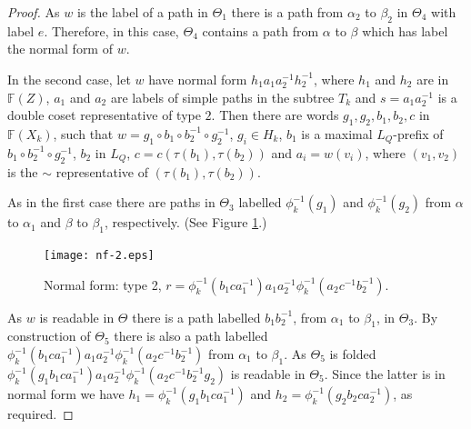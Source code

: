 \documentclass[a4paper,12pt]{article}
\renewcommand{\a}{\alpha }
\renewcommand{\b}{\beta }
\newcommand{\T}{\Theta }
\renewcommand{\t}{\tau }
\numberwithin{equation}{section}
\numberwithin{figure}{section}
\newcommand{\FF}{\ensuremath{\mathbb{F}}}
\begin{document}
\begin{proof}
As $w$ is the label of a path in $\T_1$ there is a path from $\a_2$ to
$\b_2$ in $\T_4$ with label $e$. Therefore, in this case, $\T_4$ contains
a path from $\a$ to $\b$ which has label the normal form of $w$.

In the second case,
let $w$ have normal form $h_1 a_1 a_2^{-1} h_2^{-1} $, where
$h_1$ and $h_2$ are in $\FF(Z)$,  $a_1$ and $a_2$ are labels
of simple paths in the subtree $T_k$ and $s=a_1a_2^{-1}$ is a double coset
representative of type $2$. Then there are words
$g_1, g_2, b_1, b_2, c$  in $\FF(X_k)$,  such that
$w=g_1\circ b_1 \circ b_2^{-1}\circ g_2^{-1}$,
$g_i\in H_k$, $b_1$ is a maximal $L_Q$-prefix of
$b_1 \circ b_2^{-1}\circ g_2^{-1}$, $b_2$ in
$L_Q$, $c=c(\t(b_1),\t(b_2))$ and $a_i=w(v_i)$, where
$(v_1,v_2)$ is the $\sim$ representative of $(\t(b_1),\t(b_2))$.



As in the first case there are paths in $\T_3$ labelled
$\phi_k^{-1}(g_1)$ and
$\phi_k^{-1}(g_2)$ from $\a$ to $\a_1$ and $\b$ to $\b_1$, respectively.
(See Figure \ref{fig:nf-2}.)
\begin{figure}
\begin{center}
\psfrag{a}{$\a$}
\psfrag{b}{$\b$}
\psfrag{a1}{$\a_1$}
\psfrag{a2}{$\a_2$}
\psfrag{b1}{$\b_1$}
\psfrag{b2}{$\b_2$}
\psfrag{Th5}{$\T_5$}
\texttt{[image: nf-2.eps]}
\end{center}
\caption{Normal form: type 2, $r=\phi_k^{-1}(b_1ca_1^{-1})a_1a_2^{-1}\phi_k^{-1}(a_2c^{-1}b_2^{-1})$.}
\label{fig:nf-2}
\end{figure}
As $w$ is readable in $\T$ there is a path labelled $b_1b_2^{-1}$, from
$\a_1$ to $\b_1$, in $\T_3$.
By construction of $\T_5$ there is also a path labelled
$\phi_k^{-1}(b_1ca_1^{-1})a_1a_2^{-1}\phi_k^{-1}(a_2c^{-1}b_2^{-1})$
from $\a_1$ to $\b_1$. As $\T_5$ is folded
$
\phi_k^{-1}(g_1 b_1ca_1^{-1})a_1a_2^{-1}\phi_k^{-1}(a_2c^{-1}b_2^{-1}g_2)$
 is readable in
$\T_5$. Since the latter is in normal form we have
$h_1 = \phi_k^{-1}(g_1 b_1ca_1^{-1})$ and
$h_2= \phi_k^{-1}(g_2 b_2ca_2^{-1})$, as required.
\end{proof}
\end{document}
